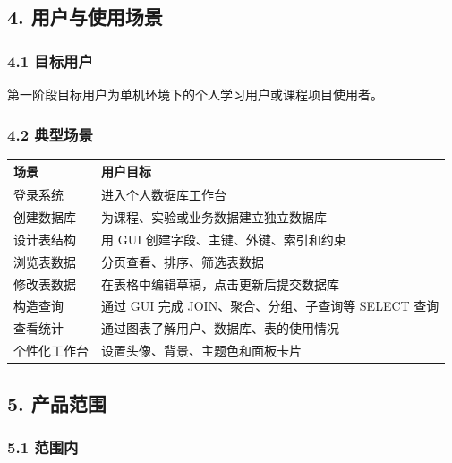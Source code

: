 \documentclass[
  a4paper,
  UTF8]{ctexart}
\begin{document}
\hypertarget{ux7528ux6237ux4e0eux4f7fux7528ux573aux666f}{%
\subsection{4.
用户与使用场景}\label{ux7528ux6237ux4e0eux4f7fux7528ux573aux666f}}

\hypertarget{ux76eeux6807ux7528ux6237}{%
\subsubsection{4.1 目标用户}\label{ux76eeux6807ux7528ux6237}}

第一阶段目标用户为单机环境下的个人学习用户或课程项目使用者。

\hypertarget{ux5178ux578bux573aux666f}{%
\subsubsection{4.2 典型场景}\label{ux5178ux578bux573aux666f}}

\begin{longtable}[]{@{}ll@{}}
\toprule
场景 & 用户目标 \\
\midrule
\endhead
登录系统 & 进入个人数据库工作台 \\
创建数据库 & 为课程、实验或业务数据建立独立数据库 \\
设计表结构 & 用 GUI 创建字段、主键、外键、索引和约束 \\
浏览表数据 & 分页查看、排序、筛选表数据 \\
修改表数据 & 在表格中编辑草稿，点击更新后提交数据库 \\
构造查询 & 通过 GUI 完成 JOIN、聚合、分组、子查询等 SELECT 查询 \\
查看统计 & 通过图表了解用户、数据库、表的使用情况 \\
个性化工作台 & 设置头像、背景、主题色和面板卡片 \\
\bottomrule
\end{longtable}

\hypertarget{ux4ea7ux54c1ux8303ux56f4}{%
\subsection{5. 产品范围}\label{ux4ea7ux54c1ux8303ux56f4}}

\hypertarget{ux8303ux56f4ux5185}{%
\subsubsection{5.1 范围内}\label{ux8303ux56f4ux5185}}
\end{document}

